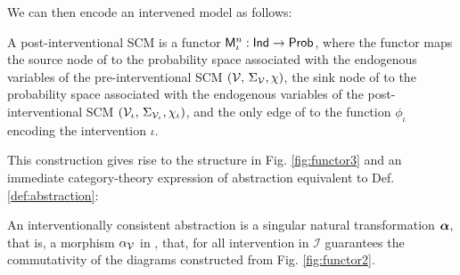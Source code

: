 We can then encode an intervened model as follows: 

\begin{definition}\label{def:SCM_ct_intervention}
    A post-interventional SCM is a functor $\mathsf{M}^n_\iota: \mathsf{Ind} \rightarrow \mathsf{Prob}$, where the functor maps the source node of \Index to the probability space associated with the endogenous variables of the pre-interventional SCM $(\mathcal{V},\, \Sigma_{\mathcal{V}}, \chi)$, the sink node of \Index to the probability space associated with the endogenous variables of the post-interventional SCM $(\mathcal{V}_\iota,\, \Sigma_{\mathcal{V}_\iota}, \chi_\iota)$, and the only edge of \Index to the function $\phi_\iota$ encoding the intervention $\iota$.
\end{definition} 

This construction gives rise to the structure in Fig. \ref{fig:functor3} and an immediate category-theory expression of abstraction equivalent to Def.\ref{def:abstraction}:
\begin{lemma}\label{lem:interventional_mixing}
    An interventionally consistent abstraction is a singular natural transformation $\boldsymbol{\alpha}$, that is, a morphism $\alpha_{\mathcal{V}}$ in \Prob, that, for all intervention in $\mathcal{I}$ guarantees the commutativity of the diagrams constructed from Fig. \ref{fig:functor2}. 
\end{lemma}

